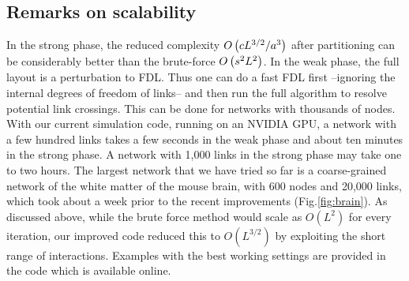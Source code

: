 \documentclass[endfloats,nofootinbib,preprint,floatfix,titlepage,superscriptaddress,linenumbers]{revtex4-1} %
\begin{document}
{\subsection{Remarks on scalability}

In the strong phase, the reduced complexity $O\left(c L^{3/2}/ a^3\right)$ after partitioning can be considerably better than the brute-force  $O\left(s^2 L^{2}\right)$.
In the weak phase, the full layout is a perturbation to FDL. 
Thus one can do a fast FDL first --ignoring the internal degrees of freedom of links-- and then run the full algorithm to resolve potential link crossings. 
This can be done for networks with thousands of nodes. 
With our current simulation code, running on an NVIDIA GPU, a network with a few hundred links takes a few seconds in the weak phase and about ten minutes in the strong phase. 
A network with 1,000 links in the strong phase may take one to two hours.
The largest network that we have tried so far is a coarse-grained network of the white matter of the mouse brain, with 600 nodes and 20,000 links, which took about a week prior to the recent improvements (Fig.\ref{fig:brain}). 
As discussed above, while the brute force method would scale as $O(L^2)$ for every iteration, our improved code reduced this to $O(L^{3/2})$ by exploiting the short range of interactions. 
Examples with the best working settings are provided in the code which is available online. 

}
\end{document}
